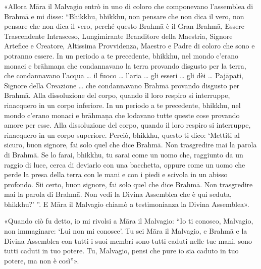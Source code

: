 «Allora Māra il Malvagio entrò in uno di coloro che componevano
l’assemblea di Brahmā e mi disse: “Bhikkhu, bhikkhu, non pensare che non
dica il vero, non pensare che non dica il vero, perché questo Brahmā è
il Gran Brahmā, Essere Trascendente Intrasceso, Lungimirante Branditore
della Maestria, Signore Artefice e Creatore, Altissima Provvidenza,
Maestro e Padre di coloro che sono e potranno essere. In un periodo a te
precedente, bhikkhu, nel mondo c’erano monaci e brāhmaṇa che
condannavano la terra provando disgusto per la terra, che condannavano
l’acqua … il fuoco … l’aria … gli esseri … gli dèi … Pajāpati, Signore
della Creazione … che condannavano Brahmā provando disgusto per Brahmā.
Alla dissoluzione del corpo, quando il loro respiro si interruppe,
rinacquero in un corpo inferiore. In un periodo a te precedente,
bhikkhu, nel mondo c’erano monaci e brāhmaṇa che lodavano tutte queste
cose provando amore per esse. Alla dissoluzione del corpo, quando il
loro respiro si interruppe, rinacquero in un corpo superiore. Perciò,
bhikkhu, questo ti dico: ‘Mettiti al sicuro, buon signore, fai solo quel
che dice Brahmā. Non trasgredire mai la parola di Brahmā. Se lo farai,
bhikkhu, tu sarai come un uomo che, raggiunto da un raggio di luce,
cerca di deviarlo con una bacchetta, oppure come un uomo che perde la
presa della terra con le mani e con i piedi e scivola in un abisso
profondo. Sii certo, buon signore, fai solo quel che dice Brahmā. Non
trasgredire mai la parola di Brahmā. Non vedi la Divina Assemblea che è
qui seduta, bhikkhu?’ ”. E Māra il Malvagio chiamò a testimonianza la
Divina Assemblea».


«Quando ciò fu detto, io mi rivolsi a Māra il Malvagio: “Io ti conosco,
Malvagio, non immaginare: ‘Lui non mi conosce’. Tu sei Māra il Malvagio,
e Brahmā e la Divina Assemblea con tutti i suoi membri sono tutti caduti
nelle tue mani, sono tutti caduti in tuo potere. Tu, Malvagio, pensi che
pure io sia caduto in tuo potere, ma non è così”».


